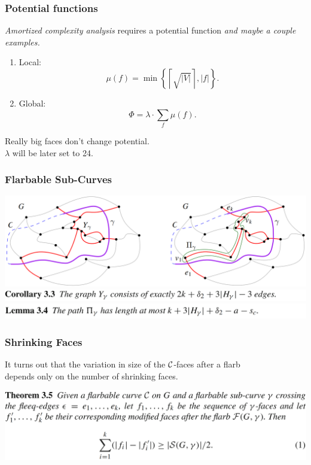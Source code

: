 \begin{frame} \frametitle{Potential functions}
{\it Amortized complexity analysis} requires a potential function {\it and maybe a couple examples.} \bigskip

\begin{enumerate}
	\item Local:
	$$\mu(f) = \min\left\{ \left\lceil
		\sqrt{\left| V \right|}
	\right\rceil, |f| \right\}.$$ \smallskip
	
	\item Global:
	$$\Phi = \lambda \cdot \sum_f \mu(f).$$
\end{enumerate} \bigskip

Really big faces don't change potential. \\
$\lambda$ will be later set to 24.
\end{frame}

\begin{frame} \frametitle{Flarbable Sub-Curves}
\begin{center}
	\includegraphics[width=14cm]{figs/subcurve.png} \\ \vspace{0.8cm}
	\includegraphics[width=14cm]{figs/3-3.png} \\ \vspace{0.4cm}
	\includegraphics[width=14cm]{figs/3-4.png}
\end{center}
\end{frame}

\begin{frame} \frametitle{Shrinking Faces}
	It turns out that the variation in size of the $\mathcal C$-faces after a flarb \\
	depends only on the number of shrinking faces. \\ \vspace{0.6cm}
\begin{center}
	\includegraphics[width=14cm]{figs/3-5.png}
\end{center}
\end{frame}

